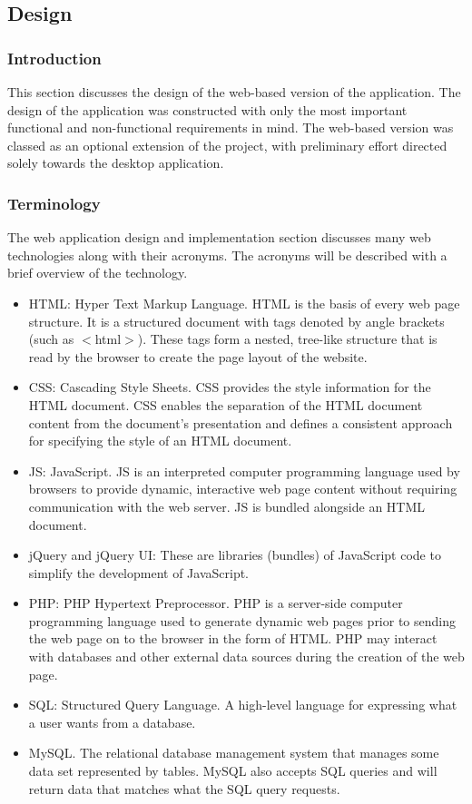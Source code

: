 \subsection{Design}

\subsubsection{Introduction}

This section discusses the design of the web-based version of the application.
The design of the application was constructed with only the most important
functional and non-functional requirements in mind. The web-based version was
classed as an optional extension of the project, with preliminary effort
directed solely towards the desktop application.

\subsubsection{Terminology}

The web application design and implementation section discusses many
web technologies along with their acronyms. The acronyms will be
described with a brief overview of the technology.

\begin{itemize}
\item HTML: Hyper Text Markup Language. HTML is the basis of every web page
structure. It is a structured document with tags denoted by angle brackets (such
as $<$html$>$). These tags form a nested, tree-like structure that is read by
the browser to create the page layout of the website.
\item CSS: Cascading Style Sheets. CSS provides the style information for the
HTML document. CSS enables the separation of the HTML document content from the
document's presentation and defines a consistent approach for specifying the
style of an HTML document.
\item JS: JavaScript. JS is an interpreted computer programming language used by
browsers to provide dynamic, interactive web page content without requiring
communication with the web server. JS is bundled alongside an HTML document.
\item jQuery and jQuery UI: These are libraries (bundles) of JavaScript code to
simplify the development of JavaScript.
\item PHP: PHP Hypertext Preprocessor. PHP is a server-side computer programming
language used to generate dynamic web pages prior to sending the web page on to
the browser in the form of HTML. PHP may interact with databases and other
external data sources during the creation of the web page.
\item SQL: Structured Query Language. A high-level language for expressing what
a user wants from a database.
\item MySQL. The relational database management system that manages some data
set represented by tables. MySQL also accepts SQL queries and will return data
that matches what the SQL query requests.
\end{itemize}

